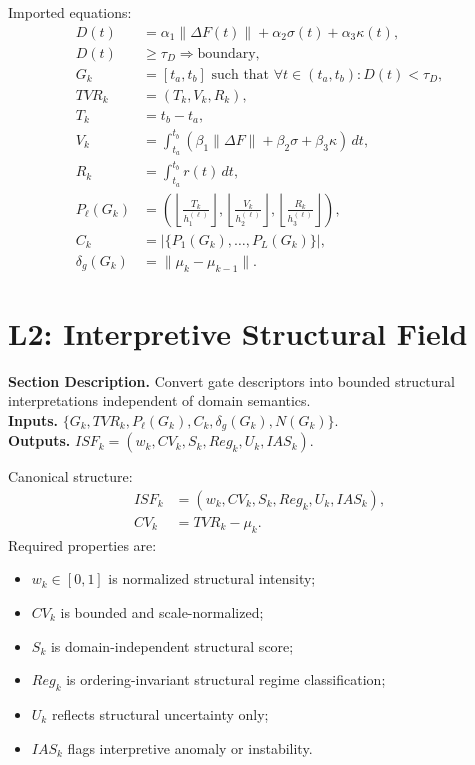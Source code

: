 \documentclass[11pt]{report}
\newcommand{\meta}[3]{\textbf{Section Description.} #1\\
\textbf{Inputs.} #2\\
\textbf{Outputs.} #3\par}
\begin{document}
Imported equations:
\begin{align*}
D(t) &= \alpha_1\lVert\Delta F(t)\rVert + \alpha_2\sigma(t) + \alpha_3\kappa(t),\\
D(t) &\ge \tau_D \Rightarrow \text{boundary},\\
G_k &= [t_a,t_b] \text{ such that } \forall t\in(t_a,t_b): D(t)<\tau_D,\\
TVR_k &= (T_k,V_k,R_k),\\
T_k &= t_b-t_a,\\
V_k &= \int_{t_a}^{t_b}(\beta_1\lVert\Delta F\rVert+\beta_2\sigma+\beta_3\kappa)\,dt,\\
R_k &= \int_{t_a}^{t_b}r(t)\,dt,\\
P_\ell(G_k) &= \left(\left\lfloor\frac{T_k}{h_1^{(\ell)}}\right\rfloor,\left\lfloor\frac{V_k}{h_2^{(\ell)}}\right\rfloor,\left\lfloor\frac{R_k}{h_3^{(\ell)}}\right\rfloor\right),\\
C_k &= \left|\{P_1(G_k),\dots,P_L(G_k)\}\right|,\\
\delta_g(G_k) &= \lVert \mu_k-\mu_{k-1}\rVert.
\end{align*}

\section{L2: Interpretive Structural Field}
\meta{Convert gate descriptors into bounded structural interpretations independent of domain semantics.}{$\{G_k,TVR_k,P_\ell(G_k),C_k,\delta_g(G_k),N(G_k)\}$.}{$ISF_k=(w_k,CV_k,S_k,Reg_k,U_k,IAS_k)$.}

Canonical structure:
\begin{align*}
ISF_k &= (w_k,CV_k,S_k,Reg_k,U_k,IAS_k),\\
CV_k &= TVR_k-\mu_k.
\end{align*}
Required properties are:
\begin{itemize}
    \item $w_k\in[0,1]$ is normalized structural intensity;
    \item $CV_k$ is bounded and scale-normalized;
    \item $S_k$ is domain-independent structural score;
    \item $Reg_k$ is ordering-invariant structural regime classification;
    \item $U_k$ reflects structural uncertainty only;
    \item $IAS_k$ flags interpretive anomaly or instability.
\end{itemize}
\end{document}
